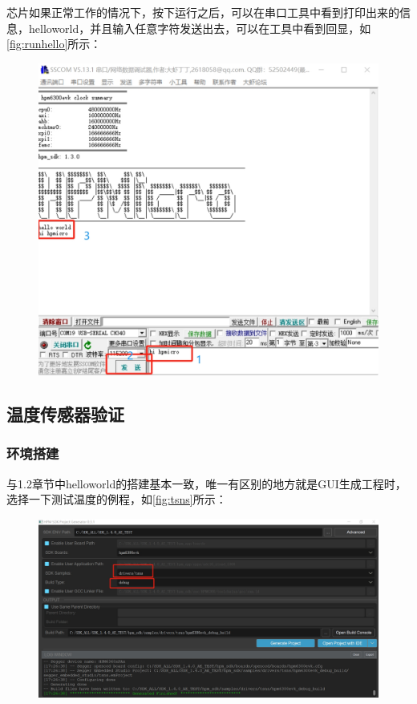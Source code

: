 \vspace{\baselineskip}
\vspace{0.3cm} 

芯片如果正常工作的情况下，按下运行之后，可以在串口工具中看到打印出来的信息，helloworld，并且输入任意字符发送出去，可以在工具中看到回显，如\autoref{fig:runhello}所示：\par
\vspace{\baselineskip}
\vspace{0.2cm}
\begin{figure}[H]
	\centering
	\includegraphics[width=0.7\linewidth]{img/runhello}
	\caption{}
	\label{fig:runhello}
\end{figure}
\vspace{\baselineskip}
\vspace{0.3cm} 

\clearpage
\subsection{温度传感器验证}
\subsubsection{环境搭建}
与1.2章节中helloworld的搭建基本一致，唯一有区别的地方就是GUI生成工程时，选择一下测试温度的例程，如\autoref{fig:tsns}所示：\par
\vspace{\baselineskip}
\vspace{0.2cm}
\begin{figure}[H]
	\centering
	\includegraphics[width=1\linewidth]{img/tsns.png}
	\caption{}
	\label{fig:tsns}
\end{figure}
\vspace{\baselineskip}
\vspace{0.3cm} 

